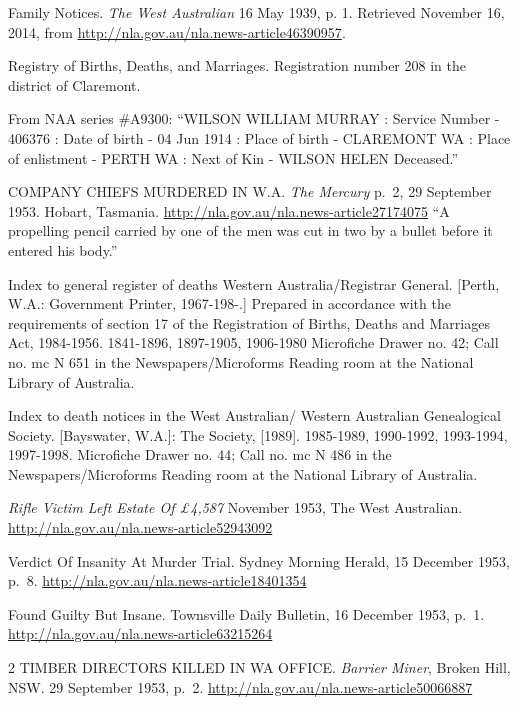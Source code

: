 \begin{thebibliography}{99}
	Family Notices. \emph{The West Australian} 16 May 1939, p. 1. Retrieved November 16, 2014, from \url{http://nla.gov.au/nla.news-article46390957}.

	Registry of Births, Deaths, and Marriages. Registration number 208 in the district of Claremont.

	From NAA series \#A9300: ``WILSON WILLIAM MURRAY : Service Number - 406376 : Date of birth - 04 Jun 1914 : Place of birth - CLAREMONT WA : Place of enlistment - PERTH WA : Next of Kin - WILSON HELEN Deceased.''

	 COMPANY CHIEFS MURDERED IN W.A. \emph{The Mercury} p.\ 2, 29 September 1953. Hobart, Tasmania.
	 \url{http://nla.gov.au/nla.news-article27174075}
	 ``A propelling pencil carried by one of the men was cut in two by a bullet before it entered his body.''

	Index to general register of deaths Western Australia/Registrar General. [Perth, W.A.: Government Printer, 1967-198-.] Prepared in accordance with the requirements of section 17 of the Registration of Births, Deaths and Marriages Act, 1984-1956. 1841-1896, 1897-1905, 1906-1980 Microfiche Drawer no. 42; Call no. mc N 651 in the Newspapers/Microforms Reading room at the National Library of Australia.

	Index to death notices in the West Australian/ Western Australian Genealogical Society. [Bayswater, W.A.]: The Society, [1989]. 1985-1989, 1990-1992, 1993-1994, 1997-1998. Microfiche Drawer no. 44; Call no. mc N 486 in the Newspapers/Microforms Reading room at the National Library of Australia.

	\emph{Rifle Victim Left Estate Of \pounds 4,587} November 1953, The West Australian.
	\url{http://nla.gov.au/nla.news-article52943092}

	Verdict Of Insanity At Murder Trial. Sydney Morning Herald, 15 December 1953, p.\ 8.
	\url{http://nla.gov.au/nla.news-article18401354}

	Found Guilty But Insane. Townsville Daily Bulletin, 16 December 1953, p.\ 1.
	\url{http://nla.gov.au/nla.news-article63215264}

	 2 TIMBER DIRECTORS KILLED IN WA OFFICE. \emph{Barrier Miner}, Broken Hill, NSW. 29 September 1953, p.\ 2.
	 \url{http://nla.gov.au/nla.news-article50066887}


\end{thebibliography}
